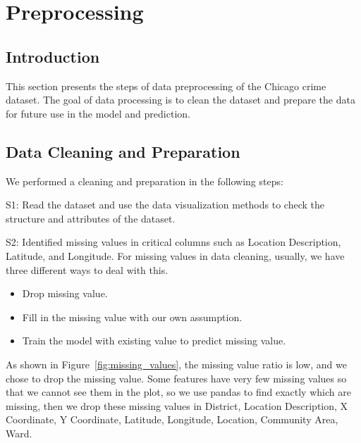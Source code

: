 \documentclass[11pt]{article}
\begin{document}



\section{Preprocessing}
\label{sec:preprocessing}

\subsection{Introduction}
\label{subsec:preprocessing_intro}
This section presents the steps of data preprocessing of the Chicago crime dataset. The goal of data processing is to clean the dataset and prepare the data for future use in the model and prediction.

\subsection{Data Cleaning and Preparation}
\label{subsec:data_cleaning}
We performed a cleaning and preparation in the following steps:

S1: Read the dataset and use the data visualization methods to check the structure and attributes of the dataset.

S2: Identified missing values in critical columns such as Location Description, Latitude, and Longitude. 
For missing values in data cleaning, usually, we have three different ways to deal with this.

\begin{itemize}
    \item Drop missing value.
    \item Fill in the missing value with our own assumption.
    \item Train the model with existing value to predict missing value.
\end{itemize}

As shown in Figure~\ref{fig:missing_values}, the missing value ratio is low, and we chose to drop the missing value. Some features have very few missing values so that we cannot see them in the plot, so we use pandas to find exactly which are missing, then we drop these missing values in District, Location Description, X Coordinate, Y Coordinate, Latitude, Longitude, Location, Community Area, Ward. 
\end{document}
